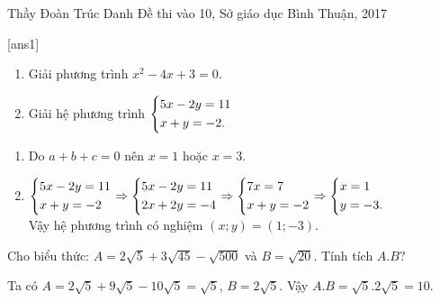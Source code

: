 \begin{name}
{Thầy  Đoàn Trúc Danh}
{Đề thi vào 10, Sở giáo dục Bình Thuận, 2017}
\end{name}
\setcounter{ex}{0}
[ans1]
\begin{ex}%
	\hfill
	\begin{enumerate}
		\item Giải phương trình $x^2-4x+3=0$.
		\item Giải hệ phương trình $\left\{\begin{aligned}&5x-2y=11\\&x+y=-2.\end{aligned}\right.$
	\end{enumerate}
	\loigiai
	{
		\begin{enumerate}
			\item 
			Do  $a+b+c=0$ nên $x=1$ hoặc $x=3$.
			\item $\left\{\begin{aligned}&5x-2y=11\\&x+y=-2\end{aligned}\right.\Rightarrow \left\{\begin{aligned}&5x-2y=11\\&2x+2y=-4\end{aligned}\right.\Rightarrow\left\{\begin{aligned}&7x=7\\&x+y=-2\end{aligned}\right.\Rightarrow\left\{\begin{aligned}& x=1\\ & y=-3.\end{aligned}\right.$\\
			Vậy hệ phương trình có nghiệm $(x;y)=(1;-3)$.
		\end{enumerate}
	}
\end{ex}

\begin{ex}%
	Cho biểu thức: $A=2\sqrt{5}+3\sqrt{45}-\sqrt{500}$ và $B=\sqrt{20}$. Tính tích $A.B?$
	
	\loigiai
	{
		Ta có $A=2\sqrt{5}+9\sqrt{5}-10\sqrt{5}=\sqrt{5}$, $B=2\sqrt{5}$. Vậy $A.B=\sqrt{5}.2\sqrt{5}=10$.
	}
\end{ex}


